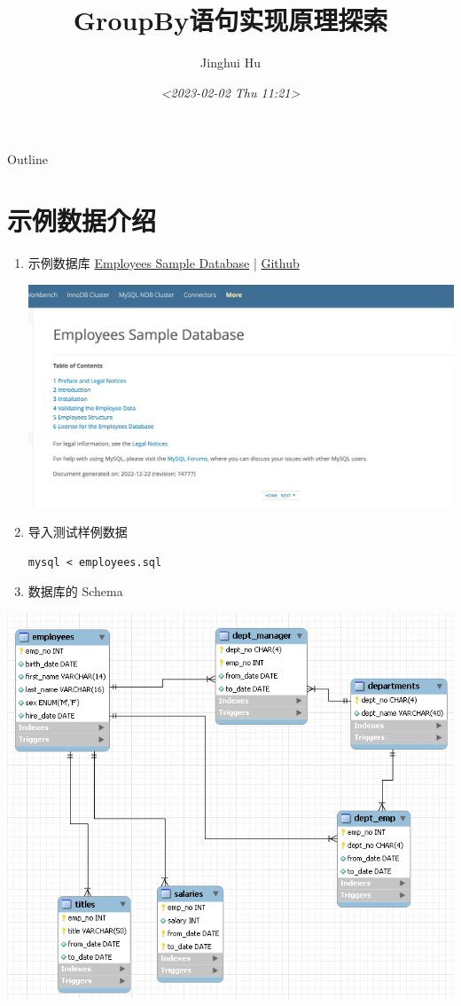 \documentclass[presentation]{beamer}
\author{Jinghui Hu}
\date{\textit{<2023-02-02 Thu 11:21>}}
\title{GroupBy语句实现原理探索}
\begin{document}
\maketitle
\begin{frame}{Outline}
\tableofcontents
\end{frame}



\section{示例数据介绍}
\label{sec:org12a3c9f}
\begin{enumerate}
\item 示例数据库 \href{https://dev.mysql.com/doc/employee/en/employees-installation.html}{Employees Sample Database} | \href{https://github.com/datacharmer/test\_db}{Github}
\begin{center}
\includegraphics[width=.9\linewidth]{../static/image/2023/0208/125223.png}
\end{center}
\item 导入测试样例数据
\begin{verbatim}
mysql < employees.sql
\end{verbatim}
\item 数据库的 Schema
\end{enumerate}
\begin{center}
\includegraphics[width=.9\linewidth]{../static/image/2023/0208/103345.png}
\end{center}
\end{document}
